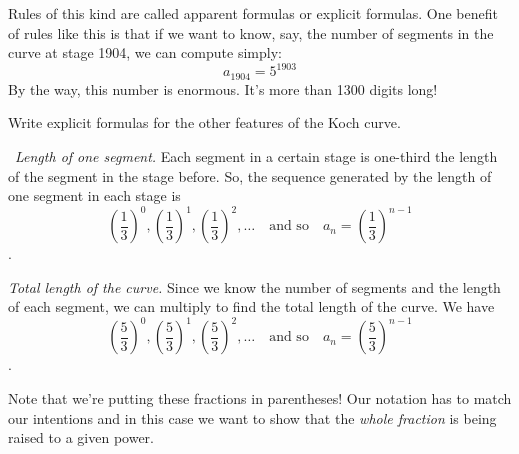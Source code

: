 Rules of this kind are called apparent formulas or explicit formulas. One benefit of rules like this is that if we want to know, say, the number of segments in the curve at stage 1904, we can compute simply: \[a_{1904} = 5^{1903}\]
By the way, this number is enormous. It's more than 1300 digits long!

\begin{boxedex}
Write explicit formulas for the other features of the Koch curve.

\exsoln\ \textit{Length of one segment.} Each segment in a certain stage is one-third the length of the segment in the stage before. So, the sequence generated by the length of one segment in each stage is \[\left(\frac{1}{3}\right)^0, \left(\frac{1}{3}\right)^1, \left(\frac{1}{3}\right)^2,\dotsc \quad\text{and so}\quad a_n = \left(\frac{1}{3}\right)^{n-1}\].

\textit{Total length of the curve.} Since we know the number of segments and the length of each segment, we can multiply to find the total length of the curve. We have \[\left(\frac{5}{3}\right)^0, \left(\frac{5}{3}\right)^1, \left(\frac{5}{3}\right)^2,\dotsc \quad\text{and so}\quad a_n = \left(\frac{5}{3}\right)^{n-1}\].
\end{boxedex}

Note that we're putting these fractions in parentheses! Our notation has to match our intentions and in this case we want to show that the \textit{whole fraction} is being raised to a given power.

